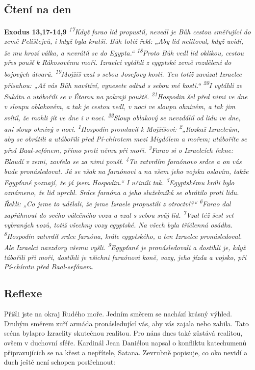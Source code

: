 \documentclass[11pt]{article}
\begin{document}
\subsection*{Čtení na den}
\textbf{Exodus 13,17-14,9}
\newline
\textit{
\textsuperscript{17}Když farao lid propustil, nevedl je Bůh cestou směřující do země Pelištejců, i když byla kratší. Bůh totiž řekl: „Aby lid nelitoval, když uvidí, že mu hrozí válka, a nevrátil se do Egypta.“
\textsuperscript{18}Proto Bůh vedl lid oklikou, cestou přes poušť k Rákosovému moři. Izraelci vytáhli z egyptské země rozděleni do bojových útvarů.
\textsuperscript{19}Mojžíš vzal s sebou Josefovy kosti. Ten totiž zavázal Izraelce přísahou: „Až vás Bůh navštíví, vynesete odtud s sebou mé kosti.“
\textsuperscript{20}I vytáhli ze Sukótu a utábořili se v Étamu na pokraji pouště.
\textsuperscript{21}Hospodin šel před nimi ve dne v sloupu oblakovém, a tak je cestou vedl, v noci ve sloupu ohnivém, a tak jim svítil, že mohli jít ve dne i v noci.
\textsuperscript{22}Sloup oblakový se nevzdálil od lidu ve dne, ani sloup ohnivý v noci.
\textsuperscript{1}Hospodin promluvil k Mojžíšovi:
\textsuperscript{2}„Rozkaž Izraelcům, aby se obrátili a utábořili před Pí-chírotem mezi Migdólem a mořem; utáboříte se před Baal-sefónem, přímo proti němu při moři.
\textsuperscript{3}Farao si o Izraelcích řekne: Bloudí v zemi, zavřela se za nimi poušť.
\textsuperscript{4}Tu zatvrdím faraónovo srdce a on vás bude pronásledovat. Já se však na faraónovi a na všem jeho vojsku oslavím, takže Egypťané poznají, že já jsem Hospodin.“ I učinili tak.
\textsuperscript{5}Egyptskému králi bylo oznámeno, že lid uprchl. Srdce faraóna a jeho služebníků se obrátilo proti lidu. Řekli: „Co jsme to udělali, že jsme Izraele propustili z otroctví?“
\textsuperscript{6}Farao dal zapřáhnout do svého válečného vozu a vzal s sebou svůj lid.
\textsuperscript{7}Vzal též šest set vybraných vozů, totiž všechny vozy egyptské. Na všech byla tříčlenná osádka.
\textsuperscript{8}Hospodin zatvrdil srdce faraóna, krále egyptského, a ten Izraelce pronásledoval. Ale Izraelci navzdory všemu vyšli.
\textsuperscript{9}Egypťané je pronásledovali a dostihli je, když tábořili při moři, dostihli je všichni faraónovi koně, vozy, jeho jízda a vojsko, při Pí-chírotu před Baal-sefónem.
}

\subsection*{Reflexe}
Přišli jste na okraj Rudého moře. Jedním směrem se nachází krásný výhled. Druhým směrem zuří armáda
pronásledující vás, aby vás zajala nebo zabila. Tato scéna bylapro Izraelity skutečnou realitou. Pro náns dnes
také zůstává realitou, ovšem v duchovní sféře.
Kardinál Jean Daniélou napsal o konfliktu katechumenů připravujících se na křest a nepřítele, Satana.
Zevrubně popisuje, co oko nevidí a duch ještě není schopen postřehnout:
\end{document}
